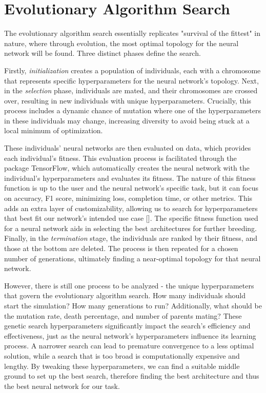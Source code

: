 \vspace{10pt}
\section{Evolutionary Algorithm Search}
The evolutionary algorithm search essentially replicates "survival of the fittest" in nature, where through evolution, the most optimal topology for the neural network will be found. Three distinct phases define the search. 

Firstly, \emph{initialization} creates a population of individuals, each with a chromosome that represents specific hyperparameters for the neural network's topology. Next, in the \emph{selection} phase, individuals are mated, and their chromosomes are crossed over, resulting in new individuals with unique hyperparameters. Crucially, this process includes a dynamic chance of mutation where one of the hyperparameters in these individuals may change, increasing diversity to avoid being stuck at a local minimum of optimization.

These individuals' neural networks are then evaluated on data, which provides each individual's fitness. This evaluation process is facilitated through the package TensorFlow, which automatically creates the neural network with the individual's hyperparameters and evaluates its fitness. The nature of this fitness function is up to the user and the neural network's specific task, but it can focus on accuracy, F1 score, minimizing loss, completion time, or other metrics. This adds an extra layer of customizability, allowing us to search for hyperparameters that best fit our network's intended use case [\cite{example7}]. The specific fitness function used for a neural network aids in selecting the best architectures for further breeding. Finally, in the \emph{termination} stage, the individuals are ranked by their fitness, and those at the bottom are deleted. The process is then repeated for a chosen number of generations, ultimately finding a near-optimal topology for that neural network. 

However, there is still one process to be analyzed - the unique hyperparameters that govern the evolutionary algorithm search. How many individuals should start the simulation? How many generations to run? Additionally, what should be the mutation rate, death percentage, and number of parents mating? These genetic search hyperparameters significantly impact the search's efficiency and effectiveness, just as the neural network's hyperparameters influence its learning process. A narrower search can lead to premature convergence to a less optimal solution, while a search that is too broad is computationally expensive and lengthy. By tweaking these hyperparameters, we can find a suitable middle ground to set up the best search, therefore finding the best architecture and thus the best neural network for our task.

